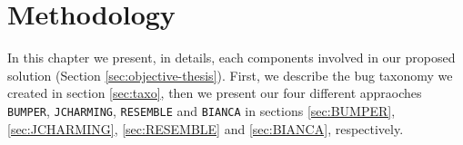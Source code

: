 
\chapter{Methodology\label{chap:methodology}}

In this chapter we present, in details, each components involved in our proposed solution (Section \ref{sec:objective-thesis}). First, we describe the bug taxonomy we created in section \ref{sec:taxo}, then we present our four different appraoches {\tt BUMPER}, {\tt JCHARMING}, {\tt RESEMBLE} and {\tt BIANCA} in sections \ref{sec:BUMPER}, \ref{sec:JCHARMING}, \ref{sec:RESEMBLE} and \ref{sec:BIANCA}, respectively.






